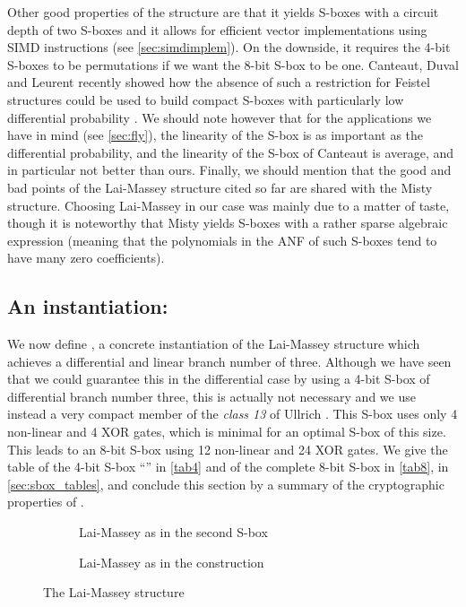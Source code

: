 Other good properties of the structure are that it yields S-boxes with a
circuit depth of two S-boxes and it allows for efficient vector implementations using SIMD instructions
(see \autoref{sec:simdimplem}).
On the downside, it requires the 4-bit S-boxes to be permutations if we want the
8-bit S-box to be one. Canteaut, Duval and Leurent recently showed how the absence of such a restriction
for Feistel structures could be used to build compact S-boxes with particularly low differential probability
\cite{sac15}. We should note however that for the applications we have in mind (see \autoref{sec:fly}),
the linearity of the
S-box is as important as the differential probability, and the linearity of the S-box of Canteaut \etal is
average, and in particular not better than ours.
Finally, we should mention that the good and bad points of the Lai-Massey structure cited so far
are shared with the Misty structure. Choosing Lai-Massey in our case was mainly due to a matter of
taste, though it is noteworthy that Misty yields S-boxes with a rather sparse algebraic expression
(meaning that the polynomials in the ANF of such S-boxes tend to have many zero coefficients).

\subsection{An instantiation: \littlunOne}

We now define \littlunOne, a concrete instantiation of the Lai-Massey structure which
achieves a differential and linear branch number of three.
Although we have seen that we could guarantee this in the differential case by using a 4-bit
S-box of differential branch number three, this is actually not necessary and we use instead a very compact
member of the \emph{class 13} of Ullrich \etal \cite{skew}. This S-box uses only 4 non-linear
and 4 XOR gates, which is minimal for an optimal S-box of this size. This leads to an
8-bit S-box using 12 non-linear and 24 XOR gates.
We give the table of the 4-bit S-box ``\littlunS'' in \autoref{tab4} and of the complete 8-bit
S-box in \autoref{tab8}, in \autoref{sec:sbox_tables}, and conclude this section by a summary of the cryptographic properties
of \littlunOne.

\begin{figure}[ht]
\centering
\begin{subfigure}[b]{0.45\textwidth}
\centering

\caption{Lai-Massey as in the \whirlpool second S-box\label{whirlpoolS}}
\end{subfigure}
\begin{subfigure}[b]{0.45\textwidth}
\centering

\caption{Lai-Massey as in the \littlun construction\label{littlunS}}
\end{subfigure}
\caption{The Lai-Massey structure}
\end{figure}

